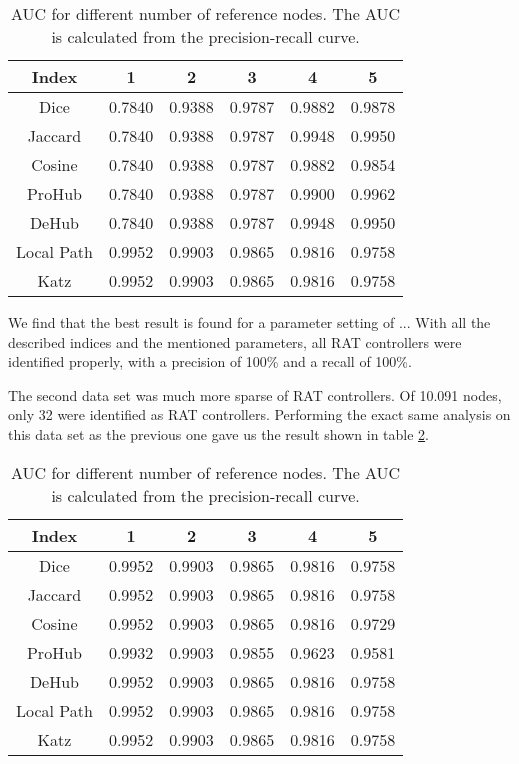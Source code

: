 \begin{table}[h!]
    \centering
    \begin{tabular}{|c|c|c|c|c|c|} %
        \hline
        Index   & 1 & 2 & 3 & 4 & 5 \\ \hline
        Dice    & 0.7840 & 0.9388 & 0.9787 & 0.9882 & 0.9878 \\
        Jaccard & 0.7840 & 0.9388 & 0.9787 & 0.9948 & 0.9950 \\
        Cosine  & 0.7840 & 0.9388 & 0.9787 & 0.9882 & 0.9854 \\
        ProHub  & 0.7840 & 0.9388 & 0.9787 & 0.9900 & 0.9962 \\
        DeHub   & 0.7840 & 0.9388 & 0.9787 & 0.9948 & 0.9950 \\
        Local Path   & 0.9952 &  0.9903  & 0.9865 & 0.9816 & 0.9758 \\
        Katz   & 0.9952 &  0.9903  & 0.9865 & 0.9816 & 0.9758 \\ \hline
    \end{tabular}
    \caption{AUC for different number of reference nodes. The AUC is calculated from the precision-recall curve.}
    \label{aucIndex}
\end{table}



We find that the best result is found for a parameter setting of ... With all the described indices and the mentioned parameters, all RAT controllers were identified properly, with a precision of 100\% and a recall of 100\%.
    
The second data set was much more sparse of RAT controllers. Of 10.091 nodes, only 32 were identified as RAT controllers. Performing the exact same analysis on this data set as the previous one gave us the result shown in table \ref{aucIndex2}.

\begin{table}[h!]
    \centering
    \begin{tabular}{|c|c|c|c|c|c|} %
    \hline
        Index   & 1 & 2 & 3 & 4 & 5 \\ \hline
        Dice    & 0.9952 &  0.9903  & 0.9865 & 0.9816 & 0.9758 \\
        Jaccard & 0.9952 &  0.9903  & 0.9865 & 0.9816 & 0.9758\\
        Cosine  & 0.9952 &  0.9903  & 0.9865 & 0.9816 & 0.9729 \\
        ProHub  & 0.9932 &  0.9903  & 0.9855 & 0.9623 & 0.9581 \\
        DeHub   & 0.9952 &  0.9903  & 0.9865 & 0.9816 & 0.9758 \\
        Local Path   & 0.9952 &  0.9903  & 0.9865 & 0.9816 & 0.9758 \\
        Katz   & 0.9952 &  0.9903  & 0.9865 & 0.9816 & 0.9758 \\ \hline
    \end{tabular}
    \caption{AUC for different number of reference nodes. The AUC is calculated from the precision-recall curve.}
    \label{aucIndex2}
\end{table}

